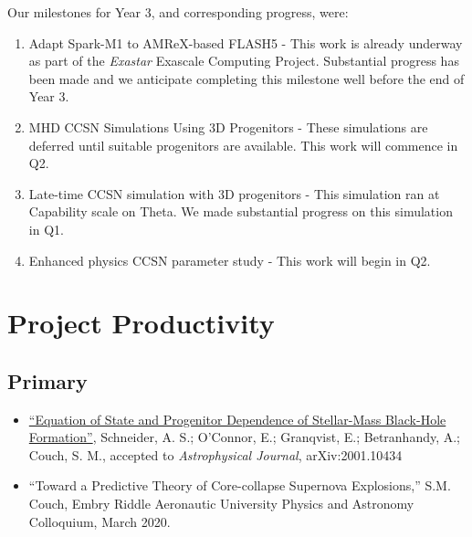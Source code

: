 \documentclass[12pt,titlepage]{article}
\begin{document}
Our milestones for Year 3, and corresponding progress, were:
\begin{enumerate}
    \item Adapt Spark-M1 to AMReX-based FLASH5 - This work is already underway as part of the {\it Exastar} Exascale Computing Project. Substantial progress has been made and we anticipate completing this milestone well before the end of Year 3.
    \item MHD CCSN Simulations Using 3D Progenitors - These simulations are deferred until suitable progenitors are available. This work will commence in Q2.
    \item Late-time CCSN simulation with 3D progenitors - This simulation ran at Capability scale on Theta. We made substantial progress on this simulation in Q1.
    \item Enhanced physics CCSN parameter study - This work will begin in Q2. 
\end{enumerate}



\section{Project Productivity}

\subsection{Primary}

\begin{itemize}
    \item \href{https://ui.adsabs.harvard.edu/abs/2020arXiv200110434S/abstract}{``Equation of State and Progenitor Dependence of Stellar-Mass Black-Hole Formation''},  Schneider, A. S.; O'Connor, E.; Granqvist, E.; Betranhandy, A.; Couch, S. M., accepted to {\itshape Astrophysical Journal}, arXiv:2001.10434
\end{itemize}


\begin{itemize}
    \item ``Toward a Predictive Theory of Core-collapse Supernova Explosions,'' S.M. Couch, Embry Riddle Aeronautic University Physics and Astronomy Colloquium, March 2020.
\end{itemize}

\end{document}
